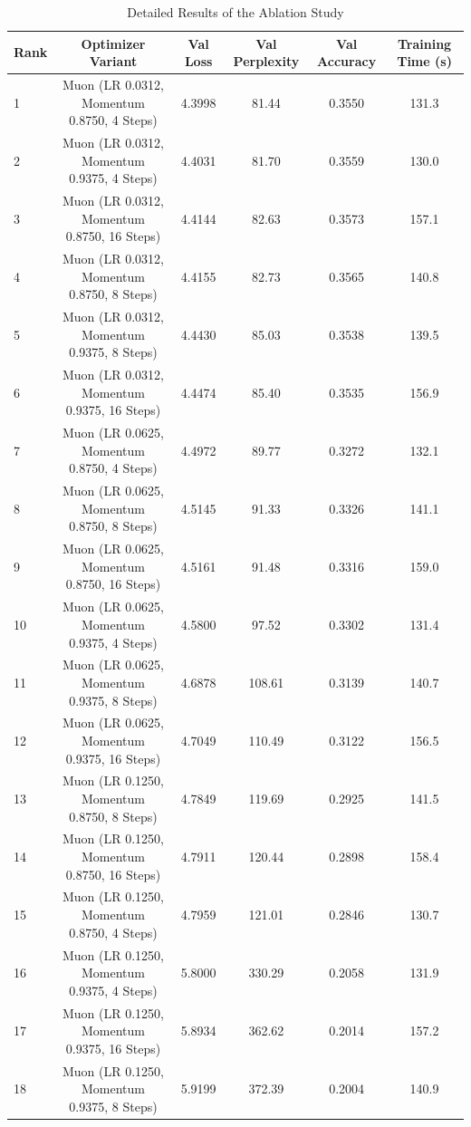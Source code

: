 \documentclass{article}
\begin{document}
\begin{table}[h!]
    \centering
    \caption{Detailed Results of the Ablation Study}
    \label{tab:detailed_results}
    \begin{tabular}{@{}lccccc@{}}
        \toprule
        \textbf{Rank} & \textbf{Optimizer Variant} & \textbf{Val Loss} & \textbf{Val Perplexity} & \textbf{Val Accuracy} & \textbf{Training Time (s)} \\
        \midrule
        1 & Muon (LR 0.0312, Momentum 0.8750, 4 Steps) & 4.3998 & 81.44 & 0.3550 & 131.3 \\
        2 & Muon (LR 0.0312, Momentum 0.9375, 4 Steps) & 4.4031 & 81.70 & 0.3559 & 130.0 \\
        3 & Muon (LR 0.0312, Momentum 0.8750, 16 Steps) & 4.4144 & 82.63 & 0.3573 & 157.1 \\
        4 & Muon (LR 0.0312, Momentum 0.8750, 8 Steps) & 4.4155 & 82.73 & 0.3565 & 140.8 \\
        5 & Muon (LR 0.0312, Momentum 0.9375, 8 Steps) & 4.4430 & 85.03 & 0.3538 & 139.5 \\
        6 & Muon (LR 0.0312, Momentum 0.9375, 16 Steps) & 4.4474 & 85.40 & 0.3535 & 156.9 \\
        7 & Muon (LR 0.0625, Momentum 0.8750, 4 Steps) & 4.4972 & 89.77 & 0.3272 & 132.1 \\
        8 & Muon (LR 0.0625, Momentum 0.8750, 8 Steps) & 4.5145 & 91.33 & 0.3326 & 141.1 \\
        9 & Muon (LR 0.0625, Momentum 0.8750, 16 Steps) & 4.5161 & 91.48 & 0.3316 & 159.0 \\
        10 & Muon (LR 0.0625, Momentum 0.9375, 4 Steps) & 4.5800 & 97.52 & 0.3302 & 131.4 \\
        11 & Muon (LR 0.0625, Momentum 0.9375, 8 Steps) & 4.6878 & 108.61 & 0.3139 & 140.7 \\
        12 & Muon (LR 0.0625, Momentum 0.9375, 16 Steps) & 4.7049 & 110.49 & 0.3122 & 156.5 \\
        13 & Muon (LR 0.1250, Momentum 0.8750, 8 Steps) & 4.7849 & 119.69 & 0.2925 & 141.5 \\
        14 & Muon (LR 0.1250, Momentum 0.8750, 16 Steps) & 4.7911 & 120.44 & 0.2898 & 158.4 \\
        15 & Muon (LR 0.1250, Momentum 0.8750, 4 Steps) & 4.7959 & 121.01 & 0.2846 & 130.7 \\
        16 & Muon (LR 0.1250, Momentum 0.9375, 4 Steps) & 5.8000 & 330.29 & 0.2058 & 131.9 \\
        17 & Muon (LR 0.1250, Momentum 0.9375, 16 Steps) & 5.8934 & 362.62 & 0.2014 & 157.2 \\
        18 & Muon (LR 0.1250, Momentum 0.9375, 8 Steps) & 5.9199 & 372.39 & 0.2004 & 140.9 \\
        \bottomrule
    \end{tabular}
    \label{tab:detailed_results}
\end{table}
\end{document}
